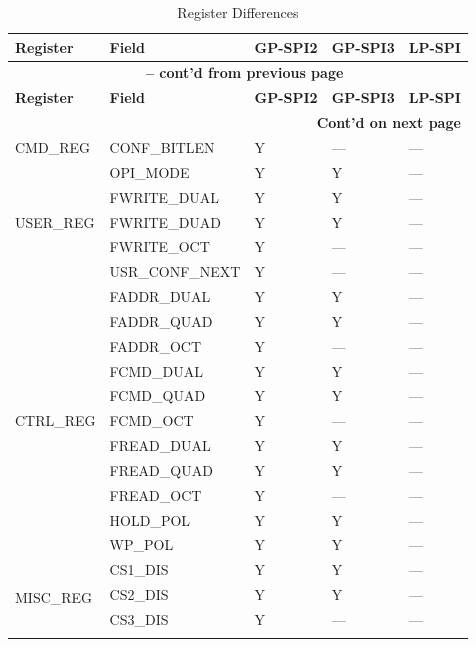\documentclass[main\_\_EN.tex]{subfiles}
\begin{document}
\begin{longtable}{|p{4.0cm}|p{6.5cm}|p{1.5cm}|p{1.5cm}|p{1.5cm}|}
\caption{Register Differences}\label{tab:register-differences}
\\
\hline
\rowcolor{lightgray}
\textbf{Register}   & \textbf{Field} & \textbf{GP-SPI2} & \textbf{GP-SPI3}  & \textbf{LP-SPI} \\ \hline
    \endfirsthead
    \multicolumn{5}{c}{\bfseries \tablename\ \thetable{} -- cont'd from previous page}\\\hline
    \rowcolor{lightgray}
    \textbf{Register}   & \textbf{Field} & \textbf{GP-SPI2} & \textbf{GP-SPI3}  & \textbf{LP-SPI}\\\hline
    \endhead

    \multicolumn{5}{r}{\textbf{Cont'd on next page}} \\
    \endfoot
    \endlastfoot
CMD\_REG & CONF\_BITLEN & Y & --- & ---  \\ \hline
\multirow{5}{*}{USER\_REG} & OPI\_MODE & Y & Y & --- \\ \cline{2-5}
& FWRITE\_DUAL & Y & Y & ---   \\ \cline{2-5}
& FWRITE\_DUAD & Y & Y & --- \\ \cline{2-5}
& FWRITE\_OCT & Y & --- & ---  \\ \cline{2-5}
& USR\_CONF\_NEXT & Y & --- & ---  \\ \hline
\multirow{11}{*}{CTRL\_REG} & FADDR\_DUAL & Y & Y & --- \\ \cline{2-5}
& FADDR\_QUAD & Y & Y & --- \\ \cline{2-5}
& FADDR\_OCT & Y & --- & --- \\ \cline{2-5}
& FCMD\_DUAL & Y & Y & --- \\ \cline{2-5}
& FCMD\_QUAD & Y & Y & --- \\ \cline{2-5}
& FCMD\_OCT & Y & --- & --- \\ \cline{2-5}
& FREAD\_DUAL & Y & Y & --- \\ \cline{2-5}
& FREAD\_QUAD & Y & Y & --- \\ \cline{2-5}
& FREAD\_OCT & Y & --- & --- \\ \cline{2-5}
& HOLD\_POL & Y & Y & --- \\ \cline{2-5}
& WP\_POL & Y & Y & --- \\ \hline
\multirow{10}{*}{MISC\_REG} & CS1\_DIS & Y & Y & --- \\ \cline{2-5}
& CS2\_DIS & Y & Y & --- \\ \cline{2-5}
& CS3\_DIS & Y & --- & --- \\ \cline{2-5}

\end{longtable}
\end{document}
